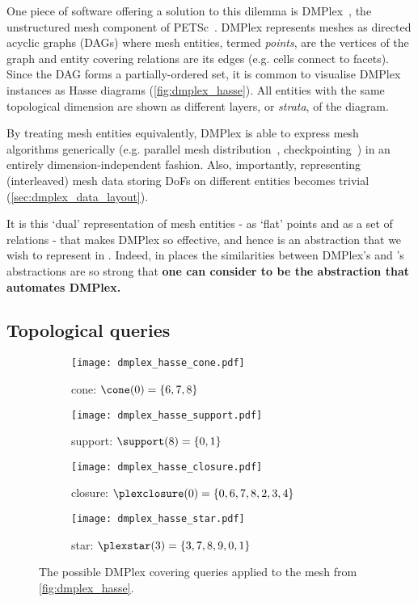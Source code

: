 \documentclass[thesis]{subfiles}
\begin{document}
One piece of software offering a solution to this dilemma is DMPlex~\cite{knepleyMeshAlgorithmsPDE2009,knepleyUnstructuredOverlappingMesh2015,langeEfficientMeshManagement2016}, the unstructured mesh component of PETSc~\cite{petsc-efficient,petsc-user-ref,petsc-web-page}.
DMPlex represents meshes as directed acyclic graphs (DAGs) where mesh entities, termed \emph{points}, are the vertices of the graph and entity covering relations are its edges (e.g. cells connect to facets).
Since the DAG forms a partially-ordered set, it is common to visualise DMPlex instances as Hasse diagrams (\cref{fig:dmplex_hasse}).
All entities with the same topological dimension are shown as different layers, or \emph{strata}, of the diagram.

By treating mesh entities equivalently, DMPlex is able to express mesh algorithms generically (e.g. parallel mesh distribution~\cite{knepleyUnstructuredOverlappingMesh2015}, checkpointing~\cite{hamEfficientNtoMCheckpointing2024}) in an entirely dimension-independent fashion.
Also, importantly, representing (interleaved) mesh data storing DoFs on different entities becomes trivial (\cref{sec:dmplex_data_layout}).

It is this `dual' representation of mesh entities - as `flat' points and as a set of relations - that makes DMPlex so effective, and hence is an abstraction that we wish to represent in .
Indeed, in places the similarities between DMPlex's and 's abstractions are so strong that \textbf{one can consider  to be the abstraction that automates DMPlex.}

\subsection{Topological queries}

\begin{figure}
  \centering
  \begin{subfigure}{.49\textwidth}
    \centering
    \texttt{[image: dmplex\_hasse\_cone.pdf]}
    \caption{cone: $\cone(0) = \{6,7,8\}$}
  \end{subfigure}
  \begin{subfigure}{.49\textwidth}
    \centering
    \texttt{[image: dmplex\_hasse\_support.pdf]}
    \caption{support: $\support(8) = \{0,1\}$}
  \end{subfigure}

  \vspace{1em}

  \begin{subfigure}{.49\textwidth}
    \centering
    \texttt{[image: dmplex\_hasse\_closure.pdf]}
    \caption{closure: $\plexclosure(0) = \{0,6,7,8,2,3,4\}$}
  \end{subfigure}
  \begin{subfigure}{.49\textwidth}
    \centering
    \texttt{[image: dmplex\_hasse\_star.pdf]}
    \caption{star: $\plexstar(3) = \{3,7,8,9,0,1\}$}
  \end{subfigure}

  \caption{
    The possible DMPlex covering queries applied to the mesh from \cref{fig:dmplex_hasse}.
  }
  \label{fig:dmplex_queries}
\end{figure}
\end{document}
